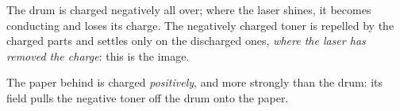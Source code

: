 \begin{abcliste}
\abc The drum is charged negatively all over; where the laser shines, it becomes conducting and loses its charge. The negatively charged toner is repelled by the charged parts and settles only on the discharged ones, \emph{where the laser has removed the charge}: this is the image.

\abc The paper behind is charged \emph{positively}, and more strongly than the drum: its field pulls the negative toner off the drum onto the paper.
\end{abcliste}
